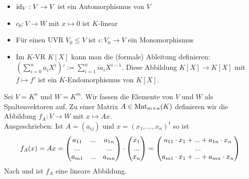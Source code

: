 \begin{example}
	\begin{itemize}
		\item $\operatorname{id}_V: V\to V$ ist ein Automorphismus von $V$
		\item $c_0:V\to W$ mit $x\mapsto 0$ ist $K$-linear
		\item Für einen UVR $V_0\le V$ ist $\iota: V_0\to V$ ein Monomorphismus
		\item Im $K$-VR $K[X]$ kann man die (formale) Ableitung definieren: $(\sum_{i=0}^n a_iX^i)' := \sum
		_{i=1}^n ia_iX^{i-1}$. Diese Abbildung $K[X]\to K[X]$ mit $f\mapsto f'$ ist ein $K$-Endomorphismus von $K[X]$.
	\end{itemize}
\end{example}

\begin{example}
	Sei $V=K^n$ und $W=K^m$. Wir fassen die Elemente von $V$ und $W$ als Spaltenvektoren auf. Zu einer 
	Matrix $A\in \operatorname{Mat}_{m\times n}(K)$ definieren wir die Abbildung $f_A:V\to W$ mit $x\mapsto Ax$. \\
	Ausgeschrieben: Ist $A=(a_{ij})$ und $x=(x_1,...,x_n)^t$ so ist
	\begin{align}
		f_A(x)=Ax=
		\begin{pmatrix}
		a_{11} & ... & a_{1n}\\
		... &  & ...\\
		a_{m1} & ... & a_{mn}\\
		\end{pmatrix} \cdot \begin{pmatrix} x_1 \\ ... \\ x_n\end{pmatrix} = 
		\begin{pmatrix}
		a_{11}\cdot x_1 + ... + a_{1n}\cdot x_n\\
		...\\
		a_{m1}\cdot x_1 + ... + a_{mn}\cdot x_n\\
		\end{pmatrix}\notag
	\end{align} 
	Nach  und  ist $f_A$ eine lineare Abbildung.
\end{example}

